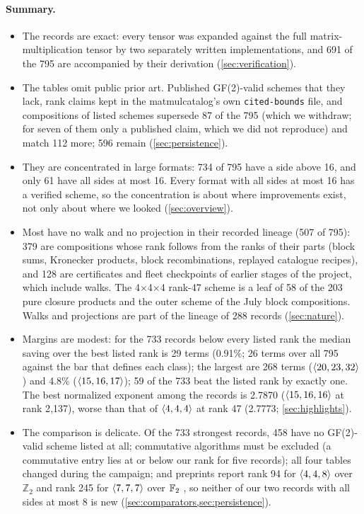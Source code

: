 \paragraph{Summary.}
\begin{itemize}
\item The records are exact: every tensor was expanded against the full matrix-multiplication tensor by two separately written implementations, and 691 of the 795 are accompanied by their derivation (\cref{sec:verification}).
\item The tables omit public prior art. Published GF(2)-valid schemes that they lack, rank claims kept in the matmulcatalog's own \texttt{cited-bounds} file, and compositions of listed schemes supersede 87 of the 795 (which we withdraw; for seven of them only a published claim, which we did not reproduce) and match 112 more; 596 remain (\cref{sec:persistence}).
\item They are concentrated in large formats: 734 of 795 have a side above 16, and only 61 have all sides at most 16. Every format with all sides at most 16 has a verified scheme, so the concentration is about where improvements exist, not only about where we looked (\cref{sec:overview}).
\item Most have no walk and no projection in their recorded lineage (507 of 795): 379 are compositions whose rank follows from the ranks of their parts (block sums, Kronecker products, block recombinations, replayed catalogue recipes), and 128 are certificates and fleet checkpoints of earlier stages of the project, which include walks. The 4$\times$4$\times$4 rank-47 scheme is a leaf of 58 of the 203 pure closure products and the outer scheme of the July block compositions.
Walks and projections are part of the lineage of 288 records (\cref{sec:nature}).
\item Margins are modest: for the 733 records below every listed rank the median saving over the best listed rank is 29 terms (0.91\%; 26 terms over all 795 against the bar that defines each class); the largest are 268 terms ($\langle 20,23,32\rangle$) and 4.8\% ($\langle 15,16,17\rangle$); 59 of the 733 beat the listed rank by exactly one.
The best normalized exponent among the records is 2.7870 ($\langle 15,16,16\rangle$ at rank 2{,}137), worse than that of $\langle 4,4,4\rangle$ at rank 47 (2.7773; \cref{sec:highlights}).
\item The comparison is delicate. Of the 733 strongest records, 458 have no GF(2)-valid scheme listed at all; commutative algorithms must be excluded (a commutative entry lies at or below our rank for five records); all four tables changed during the campaign; and preprints report rank 94 for $\langle 4,4,8\rangle$ over $\mathbb Z_2$ \cite{perminov2025ternary} and rank 245 for $\langle 7,7,7\rangle$ over ${\mathbb{F}_2}$ \cite{medley2026gpu}, so neither of our two records with all sides at most 8 is new (\cref{sec:comparators,sec:persistence}).
\end{itemize}


